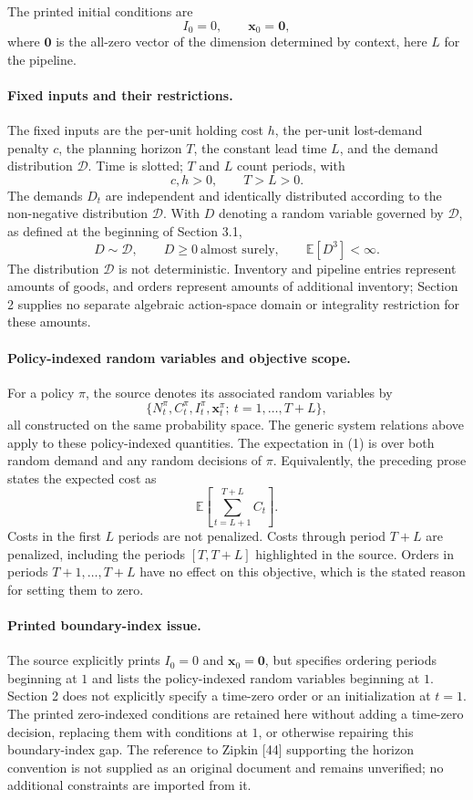 \documentclass{article}
\begin{document}
The printed initial conditions are
\[
I_0=0,\qquad \mathbf{x}_0=\mathbf{0},
\]
where $\mathbf{0}$ is the all-zero vector of the dimension determined by context, here $L$ for the pipeline.

\paragraph{Fixed inputs and their restrictions.}
The fixed inputs are the per-unit holding cost $h$, the per-unit lost-demand penalty $c$, the planning horizon $T$, the constant lead time $L$, and the demand distribution $\mathcal{D}$. Time is slotted; $T$ and $L$ count periods, with
\[
c,h>0,\qquad T>L>0.
\]
The demands $D_t$ are independent and identically distributed according to the non-negative distribution $\mathcal{D}$. With $D$ denoting a random variable governed by $\mathcal{D}$, as defined at the beginning of Section 3.1,
\[
D\sim\mathcal{D},\qquad D\geq 0\ \text{almost surely},\qquad \mathbb{E}[D^3]<\infty.
\]
The distribution $\mathcal{D}$ is not deterministic. Inventory and pipeline entries represent amounts of goods, and orders represent amounts of additional inventory; Section 2 supplies no separate algebraic action-space domain or integrality restriction for these amounts.

\paragraph{Policy-indexed random variables and objective scope.}
For a policy $\pi$, the source denotes its associated random variables by
\[
\{N_t^\pi,C_t^\pi,I_t^\pi,\mathbf{x}_t^\pi;\ t=1,\ldots,T+L\},
\]
all constructed on the same probability space. The generic system relations above apply to these policy-indexed quantities. The expectation in (1) is over both random demand and any random decisions of $\pi$. Equivalently, the preceding prose states the expected cost as
\[
\mathbb{E}\!\left[\sum_{t=L+1}^{T+L}C_t\right].
\]
Costs in the first $L$ periods are not penalized. Costs through period $T+L$ are penalized, including the periods $[T,T+L]$ highlighted in the source. Orders in periods $T+1,\ldots,T+L$ have no effect on this objective, which is the stated reason for setting them to zero.

\paragraph{Printed boundary-index issue.}
The source explicitly prints $I_0=0$ and $\mathbf{x}_0=\mathbf{0}$, but specifies ordering periods beginning at $1$ and lists the policy-indexed random variables beginning at $1$. Section 2 does not explicitly specify a time-zero order or an initialization at $t=1$. The printed zero-indexed conditions are retained here without adding a time-zero decision, replacing them with conditions at $1$, or otherwise repairing this boundary-index gap. The reference to Zipkin [44] supporting the horizon convention is not supplied as an original document and remains unverified; no additional constraints are imported from it.
\end{document}
